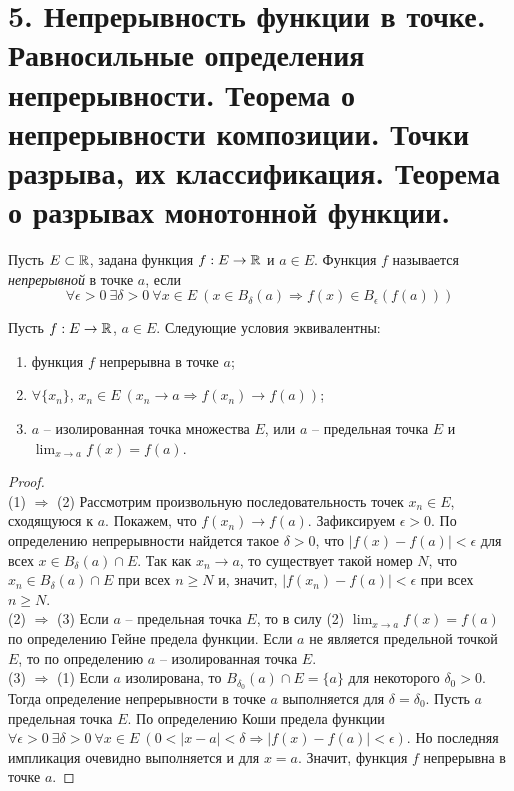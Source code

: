 \section{5. Непрерывность функции в точке. Равносильные определения непрерывности. Теорема о непрерывности композиции. Точки разрыва, их классификация. Теорема о разрывах монотонной функции.}
    \begin{definition}
        Пусть $E \subset \mathbb{R}$, задана функция $f: E \to \mathbb{R}$ и $a \in E$. Функция $f$ называется \textit{непрерывной} в точке $a$, если
        \[\forall \epsilon > 0 \ \exists \delta > 0 \ \forall x \in E \ (x \in B_{\delta}(a) \Rightarrow f(x) \in B_{\epsilon}(f(a)))\]
    \end{definition}

    \begin{theorem}
        Пусть $f: E \to \mathbb{R}$, $a \in E$. Следующие условия эквивалентны:
        \begin{enumerate}
            \item функция $f$ непрерывна в точке $a$;
            \item $\forall \{x_{n}\}$, $x_{n} \in E \ (x_{n} \to a \Rightarrow f(x_{n}) \to f(a))$;
            \item $a$ -- изолированная точка множества $E$, или $a$ -- предельная точка $E$ и $\lim_{x \to a} f(x) = f(a)$.
        \end{enumerate}
    \end{theorem}

    \begin{proof} \ \\
        (1) $\Rightarrow$ (2) Рассмотрим произвольную последовательность точек $x_{n} \in E$, сходящуюся к $a$. Покажем, что $f(x_{n}) \to f(a)$. Зафиксируем $\epsilon > 0$. По определению непрерывности найдется такое $\delta > 0$, что $|f(x) - f(a)| < \epsilon$ для всех $x \in B_{\delta}(a) \cap E$. Так как $x_{n} \to a$, то существует такой номер $N$, что $x_{n} \in B_{\delta}(a) \cap E$ при всех $n \geq N$ и, значит, $|f(x_{n}) - f(a)| < \epsilon$ при всех $n \geq N$. \\
        (2) $\Rightarrow$ (3) Если $a$ -- предельная точка $E$, то в силу (2) $\lim_{x \to a} f(x) = f(a)$ по определению Гейне предела функции. Если $a$ не является предельной точкой $E$, то по определению $a$ -- изолированная точка $E$. \\
        (3) $\Rightarrow$ (1) Если $a$ изолирована, то $B_{\delta_{0}}(a) \cap E = \{a\}$ для некоторого $\delta_{0} > 0$. Тогда определение непрерывности в точке $a$ выполняется для $\delta = \delta_{0}$. Пусть $a$ предельная точка $E$. По определению Коши предела функции $\forall \epsilon > 0 \ \exists \delta > 0 \ \forall x \in E \ (0 < |x - a| < \delta \Rightarrow |f(x) - f(a)| < \epsilon)$. Но последняя импликация очевидно выполняется и для $x = a$. Значит, функция $f$ непрерывна в точке $a$.
    \end{proof}

